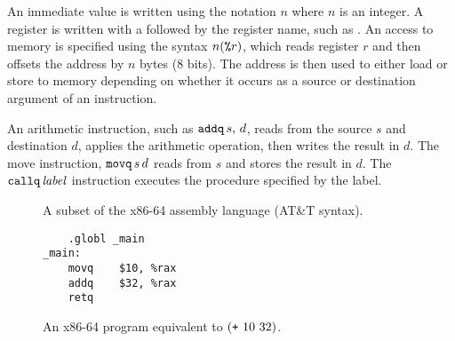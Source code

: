 \documentclass[11pt]{book}
\begin{document}
An immediate value is written using the notation \key{\$}$n$ where $n$
is an integer. 
%
A register is written with a \key{\%} followed by the register name,
such as .
%
An access to memory is specified using the syntax $n(\texttt{\%}r)$,
which reads register $r$ and then offsets the address by $n$ bytes
(8 bits). The address is then used to either load or store to memory
depending on whether it occurs as a source or destination argument of
an instruction.

An arithmetic instruction, such as $\texttt{addq}\,s,\,d$, reads from the
source $s$ and destination $d$, applies the arithmetic operation, then
writes the result in $d$.
%
The move instruction, $\texttt{movq}\,s\,d$ reads from $s$ and stores the
result in $d$. 
%
The $\texttt{callq}\,\mathit{label}$ instruction executes the procedure
specified by the label.

\begin{figure}[tbp]
\caption{A subset of the x86-64 assembly language (AT\&T syntax).}
\label{fig:x86-a}
\end{figure}


\begin{wrapfigure}{r}{2.25in}
\begin{lstlisting}
	.globl _main
_main:
	movq	$10, %rax
	addq	$32, %rax
	retq
\end{lstlisting}
\caption{An x86-64 program equivalent to $(\texttt{+}~10~32)$.}
\label{fig:p0-x86}
\end{wrapfigure}
\end{document}
